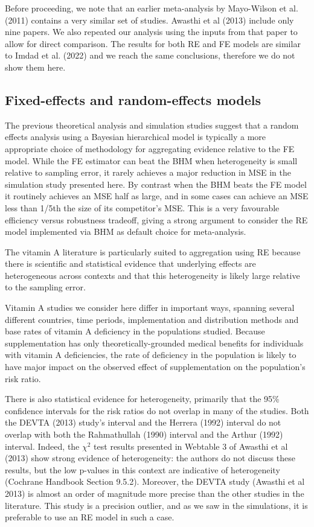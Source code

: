 \documentclass[12pt]{article}
\begin{document}
Before proceeding, we note that an earlier meta-analysis by Mayo-Wilson et al. (2011) contains a very similar set of studies. Awasthi et al (2013) include only nine papers. We also repeated our analysis using the inputs from that paper to allow for direct comparison. The results for both RE and FE models are similar to Imdad et al. (2022) and we reach the same conclusions, therefore we do not show them here.


\subsection{Fixed-effects and random-effects models}

The previous theoretical analysis and simulation studies suggest that a random effects analysis using a Bayesian hierarchical model is typically a more appropriate choice of methodology for aggregating evidence relative to the FE model. While the FE estimator can beat the BHM when heterogeneity is small relative to sampling error, it rarely achieves a major reduction in MSE in the simulation study presented here. By contrast when the BHM beats the FE model it routinely achieves an MSE half as large, and in some cases can achieve an MSE less than 1/5th the size of its competitor's MSE. This is a very favourable efficiency versus robustness tradeoff, giving a strong argument to consider the RE model implemented via BHM as default choice for meta-analysis. 

The vitamin A literature is particularly suited to aggregation using RE because there is scientific and statistical evidence that underlying effects are heterogeneous across contexts and that this heterogeneity is likely large relative to the sampling error. 

Vitamin A studies we consider here differ in important ways, spanning several different countries, time periods, implementation and distribution methods and base rates of vitamin A deficiency in the populations studied. Because supplementation has only theoretically-grounded medical benefits for individuals with vitamin A deficiencies, the rate of deficiency in the population is likely to have major impact on the observed effect of supplementation on the population's risk ratio. 

There is also statistical evidence for heterogeneity, primarily that the 95\% confidence intervals for the risk ratios do not overlap in many of the studies. Both the DEVTA (2013) study's interval and the Herrera (1992) interval do not overlap with both the Rahmathullah (1990) interval and the Arthur (1992) interval. Indeed, the $\chi^2$ test results presented in Webtable 3 of Awasthi et al (2013) show strong evidence of heterogeneity: the authors do not discuss these results, but the low p-values in this context are indicative of heterogeneity (Cochrane Handbook Section 9.5.2). Moreover, the DEVTA study (Awasthi et al 2013) is almost an order of magnitude more precise than the other studies in the literature. This study is a precision outlier, and as we saw in the simulations, it is preferable to use an RE model in such a case.
\end{document}
